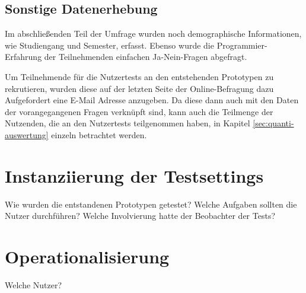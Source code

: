 %
%

\subsection{Sonstige Datenerhebung}
Im abschließenden Teil der Umfrage wurden noch demographische Informationen, wie Studiengang und Semester, erfasst. Ebenso wurde die Programmier-Erfahrung der Teilnehmenden einfachen Ja-Nein-Fragen abgefragt.

Um Teilnehmende für die Nutzertests an den entstehenden Prototypen zu rekrutieren, wurden diese auf der letzten Seite der Online-Befragung dazu Aufgefordert eine E-Mail Adresse anzugeben. Da diese dann auch mit den Daten der vorangegangenen Fragen verknüpft sind, kann auch die Teilmenge der Nutzenden, die an den Nutzertests teilgenommen haben, in Kapitel \ref{sec:quanti-auswertung} einzeln betrachtet werden.

%

\section{Instanziierung der Testsettings} %
Wie wurden die entstandenen Prototypen getestet? Welche Aufgaben sollten die Nutzer durchführen? Welche Involvierung hatte der Beobachter der Tests?

\section{Operationalisierung}
Welche Nutzer? 